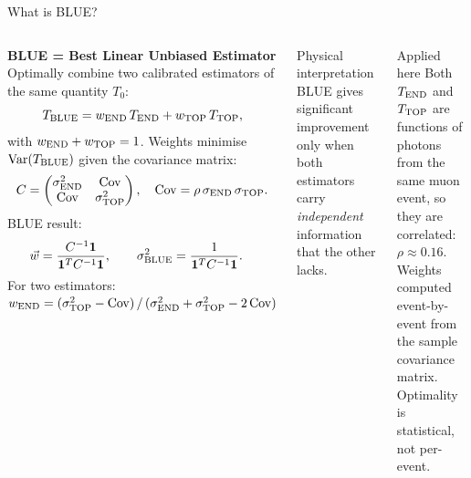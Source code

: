 \documentclass[aspectratio=169,9pt]{beamer}
\newcommand{\rhoETval}{0.16}
\begin{document}
\begin{frame}{What is BLUE?}
  \begin{columns}[T]
      {\small\bfseries BLUE = Best Linear Unbiased Estimator}\\[4pt]
      {\small Optimally combine two calibrated estimators of the same quantity $T_0$:}
      \[
        T_{\rm BLUE} = w_{\rm END}\,T_{\rm END} + w_{\rm TOP}\,T_{\rm TOP},
      \]
      with $w_{\rm END}+w_{\rm TOP}=1$.\vspace{-2pt}
      {\small Weights minimise $\mathrm{Var}(T_{\rm BLUE})$ given the covariance matrix:}
      \[
        C =
        \begin{pmatrix}
          \sigma_{\rm END}^2 & \mathrm{Cov}\\
          \mathrm{Cov} & \sigma_{\rm TOP}^2
        \end{pmatrix},
        \quad \mathrm{Cov}=\rho\,\sigma_{\rm END}\,\sigma_{\rm TOP}.
      \]
      {\small BLUE result:}
      \begin{align*}
        \vec w &= \frac{C^{-1}\mathbf{1}}{\mathbf{1}^TC^{-1}\mathbf{1}},
        \qquad
        \sigma_{\rm BLUE}^2 = \frac{1}{\mathbf{1}^TC^{-1}\mathbf{1}}.
      \end{align*}
      {\footnotesize For two estimators:\\[2pt]
      $w_{\rm END} = (\sigma_{\rm TOP}^2-\mathrm{Cov})\,/\,
                    (\sigma_{\rm END}^2+\sigma_{\rm TOP}^2-2\,\mathrm{Cov})$}
      \begin{block}{Physical interpretation}
        {\small BLUE gives significant improvement only when both estimators
        carry \emph{independent} information that the other lacks.}
      \end{block}
      \vspace{4pt}
      \begin{alertblock}{Applied here}
        {\footnotesize
        Both $T_{\rm END}$ and $T_{\rm TOP}$ are functions of photons from the
        same muon event, so they are correlated: $\rho\approx\rhoETval$.\\[4pt]
        Weights computed event-by-event from the sample covariance matrix.
        Optimality is statistical, not per-event.}
      \end{alertblock}
  \end{columns}
\end{frame}
\end{document}
